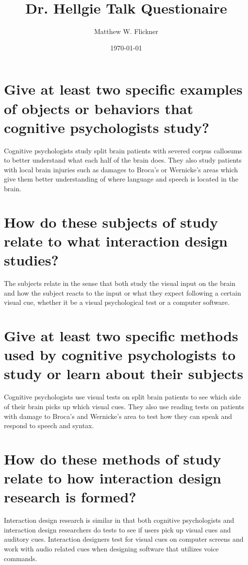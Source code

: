 \documentclass[a4paper]{article}
\title{Dr. Hellgie Talk Questionaire}
\author{Matthew W. Flickner}
\date{\today}
\begin{document}
\maketitle

\section{Give at least two specific examples of objects or behaviors that cognitive psychologists study?}
Cognitive psychologists study split brain patients with severed corpus callosums to better understand what each half of the brain does. They also study patients with local brain injuries such as damages to Broca's or Wernicke's areas which give them better understanding of where language and speech is located in the brain.

\section{How do these subjects of study relate to what interaction design studies?}
The subjects relate in the sense that both study the visual input on the brain and how the subject reacts to the input or what they expect following a certain visual cue, whether it be a visual psychological test or a computer software.

\section{Give at least two specific methods used by cognitive psychologists to study or learn about their subjects}
Cognitive psychologists use visual tests on split brain patients to see which side of their brain picks up which visual cues. They also use reading tests on patients with damage to Broca's and Wernicke's area to test how they can speak and respond to speech and syntax.

\section{How do these methods of study relate to how interaction design research is formed?}
Interaction design research is similar in that both cognitive psychologists and interaction design researchers do tests to see if users pick up visual cues and auditory cues. Interaction designers test for visual cues on computer screens and work with audio related cues when designing software that utilizes voice commands.
\end{document}

